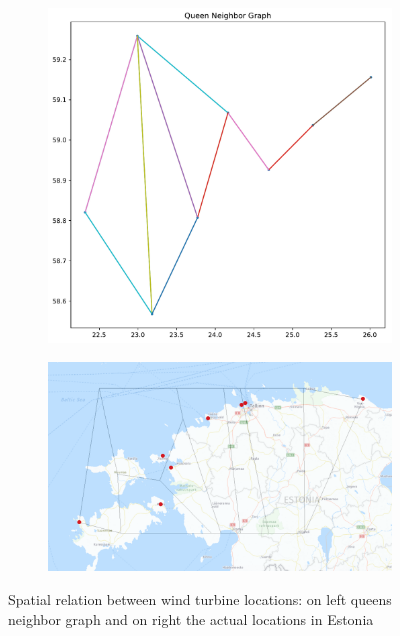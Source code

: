 \begin{figure}
\centering
\begin{subfigure}{.5\textwidth}
  \centering
  \includegraphics[width=\linewidth]{./sec/fig/queenrelationships.pdf}
  \label{fig:sub1}
\end{subfigure}%
\begin{subfigure}{.5\textwidth}
  \centering
  \includegraphics[width=\linewidth]{./sec/fig/thiessen_polygons.png}
  \label{fig:sub2}
\end{subfigure}
\caption{Spatial relation between wind turbine locations: on left queens neighbor graph and on right the actual locations in Estonia}
\label{fig:queen}
\end{figure}


